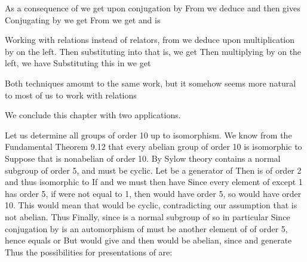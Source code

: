 \documentclass[11pt,oneside]{article}
\begin{document}
\begin{BookBody}
As a consequence of  we get  upon conjugation by  From  we deduce  and then  gives  Conjugating  by  we get  From  we get  and  is 

Working with relations instead of relators, from  we deduce  upon multiplication by  on the left. Then substituting  into  that is,  we get  Then multiplying by  on the left, we have  Substituting this in  we get 

Both techniques amount to the same work, but it somehow seems more natural to most of us to work with relations\BookEnd{\blacktriangle}


\noindent We conclude this chapter with two applications.

 Let us determine all groups of order 10 up to isomorphism. We know from the Fundamental Theorem 9.12 that every abelian group of order 10 is isomorphic to  Suppose that  is nonabelian of order 10. By Sylow theory contains a normal subgroup  of order 5, and  must be cyclic. Let  be a generator of  Then  is of order 2 and thus isomorphic to  If  and  we must then have  Since every element of  except 1 has order 5, if  were not equal to 1, then  would have order 5, so  would have order 10. This would mean that  would be cyclic, contradicting our assumption that  is not abelian. Thus  Finally, since  is a normal subgroup of  so in particular Since conjugation by  is an automorphism of  must be another element of  of order 5, hence  equals  or  But  would give  and then  would be abelian, since  and  generate  Thus the possibilities for presentations of  are:


\end{BookBody}
\end{document}
